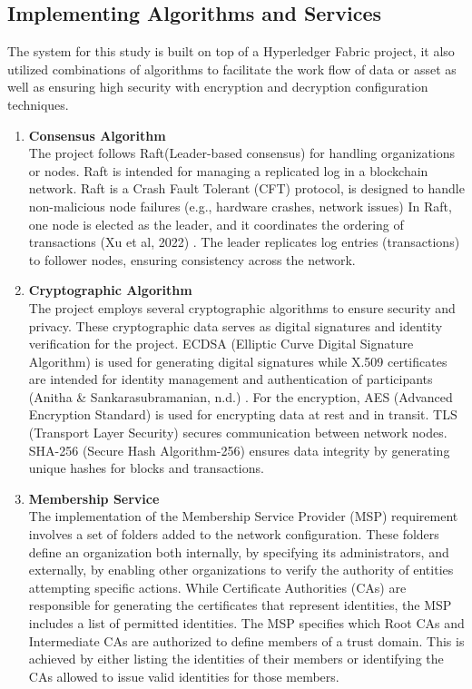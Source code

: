 \subsection{Implementing Algorithms and Services}
The system for this study is built on top of a Hyperledger Fabric project, it also utilized combinations of algorithms to facilitate the work flow of data or asset as well as ensuring high security with encryption and decryption configuration techniques. 
	\begin{enumerate}
		\item \textbf{Consensus Algorithm} \\The project follows Raft(Leader-based consensus) for handling organizations or nodes. Raft is intended for managing a replicated log in a blockchain network. Raft is a Crash Fault Tolerant (CFT) protocol, is designed to handle non-malicious node failures (e.g., hardware crashes, network issues) In Raft, one node is elected as the leader, and it coordinates the ordering of transactions (Xu et al, 2022) \nocite{method-1}. The leader replicates log entries (transactions) to follower nodes, ensuring consistency across the network. 
		
		\item \textbf{Cryptographic Algorithm} \\The project employs several cryptographic algorithms to ensure security and privacy. These cryptographic data serves as digital signatures and identity verification for the project. ECDSA (Elliptic Curve Digital Signature Algorithm) is used for generating digital signatures while X.509 certificates are intended for identity management and authentication of participants (Anitha \& Sankarasubramanian, n.d.) \nocite{method-2}. For the encryption, AES (Advanced Encryption Standard) is used for encrypting data at rest and in transit. TLS (Transport Layer Security) secures communication between network nodes. SHA-256 (Secure Hash Algorithm-256) ensures data integrity by generating unique hashes for blocks and transactions.
		
		\item \textbf{Membership Service} \\The implementation of the Membership Service Provider (MSP) requirement involves a set of folders added to the network configuration. These folders define an organization both internally, by specifying its administrators, and externally, by enabling other organizations to verify the authority of entities attempting specific actions. While Certificate Authorities (CAs) are responsible for generating the certificates that represent identities, the MSP includes a list of permitted identities. The MSP specifies which Root CAs and Intermediate CAs are authorized to define members of a trust domain. This is achieved by either listing the identities of their members or identifying the CAs allowed to issue valid identities for those members.
		

\end{enumerate}
